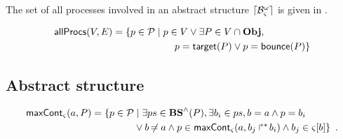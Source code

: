 \begin{comment}
\begin{definition}[$\uconcr: \powerset(\OS) \mapsto \powerset(\Sce)$]
\label{def:uconcr-set}
  $\uconcr(\Omega) = \{ \delta \in \uconcr(\w) \mid \w \in \Omega\}$
\end{definition}
\end{comment}

The set of all processes involved in an abstract structure $\lceil \mathcal{B}_\varsigma^\omega\rceil$ is given in .
\begin{definition}
\label{def:allprocs}
  \begin{align*}
  \mathsf{allProcs}(V, E) = \{ p \in \mathcal{P} &\mid p \in V \vee \exists P \in V \cap \mathbf{Obj},\\
  &\qquad p = \mathsf{target}(P) \vee p = \mathsf{bounce}(P) \}
  \end{align*}
\end{definition}

\begin{comment}
\begin{definition} \todo{À revoir avec la nouvelle sémantique}
\label{def:allprocs}
  \begin{align*}
  &\allprocs((\cwSol,\cwReq,\cwRSP,\cwCont)) = \{ p \in \PHproc \mid \exists (P,ps) \in \cwSol, \\
    &\qquad\qquad p \in ps \vee p = \PHtarget(P) \vee p = \PHbounce(P) \\
    &\qquad\qquad \vee \exists (a_i,ps) \in \cwRSP, p \in ps \}
  \end{align*}
\end{definition}
\end{comment}



\subsection{Abstract structure}


\begin{definition}[$\gCont_\ctx : \Sigma \times \Obj \mapsto \powerset(\PHproc)$]
  \label{def:maxCont}
  \begin{align*}
    \mathsf{maxCont}_\varsigma(a,P) = 
    \{ p \in \mathcal{P} &\mid \exists ps \in \mathbf{BS}^\wedge(P), \exists b_i \in ps, b = a \wedge p = b_i \\
      & \vee b \not\nobreak\mkern -2mu = a \wedge p \in \mathsf{maxCont}_\varsigma(a, \mbox{$b_j\Rsh^*\!b_i$}) \wedge b_j \in {\varsigma[b]} \}
    \enspace.
  \end{align*}
\end{definition}

